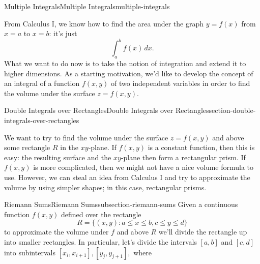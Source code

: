 \documentclass[oneside,10pt,]{book}
\numberwithin{equation}{section}
\begin{document}
\begin{chapterptx}{Multiple Integrals}{}{Multiple Integrals}{}{}{multiple-integrals}
\begin{introduction}{}%
\hypertarget{p-1460}{}%
From Calculus I, we know how to find the area under the graph \(y = f(x)\) from \(x = a\) to \(x = b\): it's just%
\begin{equation*}
\int_{a}^{b}f(x)\,dx.
\end{equation*}
What we want to do now is to take the notion of integration and extend it to higher dimensions. As a starting motivation, we'd like to develop the concept of an integral of a function \(f(x,y)\) of two independent variables in order to find the volume under the surface \(z = f(x,y)\).%
\end{introduction}%
%
%
\typeout{************************************************}
\typeout{************************************************}
%
\begin{sectionptx}{Double Integrals over Rectangles}{}{Double Integrals over Rectangles}{}{}{section-double-integrals-over-rectangles}
\begin{introduction}{}%
\hypertarget{p-1461}{}%
We want to try to find the volume under the surface \(z = f(x,y)\) and above some rectangle \(R\) in the \(xy\)-plane. If \(f(x,y)\) is a constant function, then this is easy: the resulting surface and the \(xy\)-plane then form a rectangular prism. If \(f(x,y)\) is more complicated, then we might not have a nice volume formula to use. However, we can steal an idea from Calculus I and try to approximate the volume by using simpler shapes; in this case, rectangular prisms.%
\end{introduction}%
%
%
\typeout{************************************************}
\typeout{************************************************}
%
\begin{subsectionptx}{Riemann Sums}{}{Riemann Sums}{}{}{subsection-riemann-sums}
\hypertarget{p-1462}{}%
Given a continuous function \(f(x,y)\) defined over the rectangle%
\begin{equation*}
R = \{(x,y) : a\leq x\leq b, c\leq y\leq d\}
\end{equation*}
to approximate the volume under \(f\) and above \(R\) we'll divide the rectangle up into smaller rectangles. In particular, let's divide the intervals \([a,b]\) and \([c,d]\) into subintervals \([x_{i},x_{i+1}], [y_{j},y_{j+1}],\) where%
\begin{align*}

\end{align*}
\end{subsectionptx}
\end{sectionptx}
\end{chapterptx}
\end{document}
